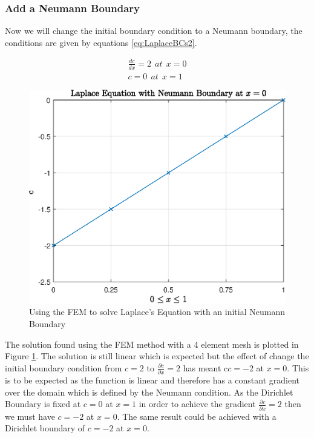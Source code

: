 \documentclass[11pt]{article}
\begin{document}
\subsubsection{Add a Neumann Boundary}
Now we will change the initial boundary condition to a Neumann boundary, the conditions are given by equations \ref{eq:LaplaceBCs2}.

\begin{subequations}\label{eq:LaplaceBCs2}
\begin{align}
\frac{dc}{dx} = 2 \ \ at \ \ x = 0 \\
c = 0 \ \ at \ \  x= 1
\end{align}
\end{subequations}

\begin{figure}[h!] \label{fig:LaplaceFig2}
    \centering
    \includegraphics{epsLaplaceFig2}
    \caption{Using the FEM to solve Laplace's Equation with an initial Neumann Boundary}
\end{figure}

The solution found using the FEM method with a 4 element mesh is plotted in Figure \ref{fig:LaplaceFig2}. The solution is still linear which is expected but the effect of change the initial boundary condition from $c = 2$ to $\frac{\partial c}{\partial x} = 2$ has meant c$c = -2$ at $x = 0$. This is to be expected as the function is linear and therefore has a constant gradient over the domain which is defined by the Neumann condition. As the Dirichlet Boundary is fixed at $c = 0$ at $x = 1$ in order to achieve the gradient $\frac{\partial c}{\partial x} = 2$ then we must have $c = -2$ at $x = 0$. The same result could be achieved with a Dirichlet boundary of $c = -2$ at $x = 0$.
\end{document}
